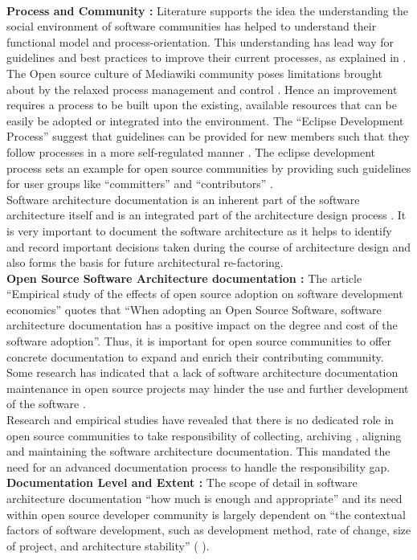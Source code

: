\indent
\\\indent \textbf{Process and Community : } Literature supports the idea the understanding the social environment of software communities has helped to understand their functional model and process-orientation. This understanding has lead way for guidelines and best practices to improve their current processes, as explained in \cite{bab2009}. The Open source culture of Mediawiki community poses limitations brought about by the relaxed process management and control \cite{6923128}. Hence an improvement requires a process to be built upon the existing, available resources that can be easily be adopted or integrated into the environment. The \enquote{Eclipse Development Process} suggest that guidelines can be provided for new members such that they follow processes in a more self-regulated manner \cite{eclipse2013}. The eclipse development process sets an example for open source communities by providing such guidelines for user groups like \enquote{committers} and \enquote{contributors} .
\\\indent Software architecture documentation is an inherent part of the software architecture itself and is an integrated part of the architecture design process \cite{Shahin2009}. It is very important to document the software architecture as it helps to identify and record important decisions taken during the course of architecture design and also forms the basis for future architectural re-factoring.
\newline
\\\indent \textbf{Open Source Software Architecture documentation : } The article \enquote{Empirical study of the effects of open source adoption on software development economics} \cite{Ajila2007} quotes that \enquote{When adopting an Open Source Software, software architecture documentation has a positive impact on the degree and cost of the software adoption}. Thus, it is important for open source communities to offer concrete documentation to expand and enrich their contributing community. Some research has indicated that a lack of software architecture documentation maintenance in open source projects may hinder the use and further development of the software \cite{michlmayr:quality_problems}.
\\\indent Research and empirical studies \cite{6923128} have revealed that there is no dedicated role in open source communities to take responsibility of collecting, archiving , aligning and maintaining the software architecture documentation. This mandated the need for an advanced documentation process to handle the responsibility gap.
\newline
\\\indent \textbf{Documentation Level and Extent : } The scope of detail in software architecture documentation \enquote{how much is enough and appropriate} and its need within open source developer community is largely dependent on \enquote{the contextual factors of software development, such as development method, rate of change, size of project, and architecture stability} (\cite{SMR:SMR572} \cite{Briand2003}).

